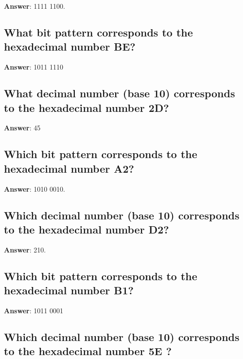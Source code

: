 \documentclass[a4paper,11pt,oneside]{article}
\begin{document}
\begin{sloppypar}
\label{q:393:sa:en:True}

\textbf{Answer}: 1111 1100.



\subsection{What bit pattern corresponds to the hexadecimal number BE?}

\label{q:394:sa:en:True}

\textbf{Answer}: 1011 1110



\subsection{What decimal number (base 10) corresponds to the hexadecimal number 2D?}

\label{q:395:sa:en:True}

\textbf{Answer}: 45



\subsection{Which bit pattern corresponds to the hexadecimal number A2?}

\label{q:396:sa:en:True}

\textbf{Answer}: 1010 0010.



\subsection{Which decimal number (base 10) corresponds to the hexadecimal number D2?}

\label{q:397:sa:en:True}

\textbf{Answer}: 210.



\subsection{Which bit pattern corresponds to the hexadecimal number B1?}

\label{q:398:sa:en:True}

\textbf{Answer}: 1011 0001



\subsection{Which decimal number (base 10) corresponds to the hexadecimal number  5E ?}


\end{sloppypar}
\end{document}
